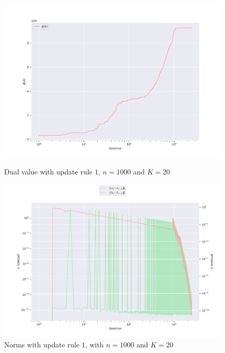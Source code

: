 \documentclass[notitlepage]{article}
\begin{document}
\begin{figure}[H]
  \begin{minipage}{0.49\textwidth}
    \centering
    \includegraphics[scale=0.33]{pics/n=1000_K=20_dual_rule=1.png}
    \caption{Dual value with update rule $1$, $n=1000$ and $K=20$}
    \label{fig:rule-1-n-1000-k-20-dual}
  \end{minipage}
  \begin{minipage}{0.49\textwidth}
    \centering
    \includegraphics[scale=0.33]{pics/n=1000_K=20_lambda_rule=1.png}
    \caption{Norms with update rule $1$, with $n=1000$ and $K=20$}
    \label{fig:rule-1-n-1000-k-20-norm}
  \end{minipage}  
\end{figure}

\vfill
\hspace{0pt}
\end{document}
